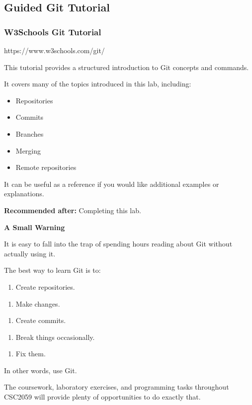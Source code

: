 \documentclass{csc2059practical}
\begin{document}
\subsection{Guided Git Tutorial}
\subsubsection{W3Schools Git Tutorial}
https://www.w3schools.com/git/

This tutorial provides a structured introduction to Git concepts and commands.

It covers many of the topics introduced in this lab, including:

\begin{itemize}
  \item Repositories
  \item Commits
  \item Branches
  \item Merging
  \item Remote repositories
\end{itemize}
It can be useful as a reference if you would like additional examples or explanations.

\textbf{Recommended after:} Completing this lab.

\begin{importantnote}
\textbf{A Small Warning}\par
\medskip

It is easy to fall into the trap of spending hours reading about Git without actually using it.


The best way to learn Git is to:


\begin{enumerate}
  \item Create repositories.
\end{enumerate}

\begin{enumerate}
  \item Make changes.
\end{enumerate}

\begin{enumerate}
  \item Create commits.
\end{enumerate}

\begin{enumerate}
  \item Break things occasionally.
\end{enumerate}

\begin{enumerate}
  \item Fix them.
\end{enumerate}

In other words, use Git.


The coursework, laboratory exercises, and programming tasks throughout CSC2059 will provide plenty of opportunities to do exactly that.


\end{importantnote}
\end{document}
